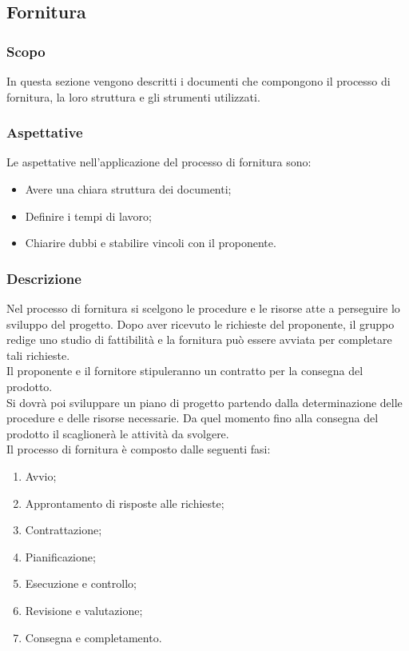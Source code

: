 \subsection{Fornitura}
\subsubsection{Scopo}
In questa sezione vengono descritti i documenti che compongono il processo di fornitura, la loro struttura e gli strumenti utilizzati.

\subsubsection{Aspettative}
Le aspettative nell'applicazione del processo di fornitura sono:
\begin{itemize}
	\item Avere una chiara struttura dei documenti;
	\item Definire i tempi di lavoro;
	\item Chiarire dubbi e stabilire vincoli con il proponente.
\end{itemize}

\subsubsection{Descrizione}
Nel processo di fornitura si scelgono le procedure e le risorse atte a perseguire lo sviluppo del progetto. Dopo aver ricevuto le richieste del proponente, il gruppo redige uno studio di fattibilità e la fornitura può essere avviata per completare tali richieste.\\
Il proponente e il fornitore stipuleranno un contratto per la consegna del prodotto.\\
Si dovrà poi sviluppare un piano di progetto partendo dalla determinazione delle procedure e delle risorse necessarie.
Da quel momento fino alla consegna del prodotto il \PdP{} scaglionerà le attività da svolgere. \\
 Il processo di fornitura è composto dalle seguenti fasi:
 \begin{enumerate}
 \item Avvio; 
\item Approntamento di risposte alle richieste;
\item Contrattazione;
\item Pianificazione;
\item Esecuzione e controllo;
\item Revisione e valutazione;
\item Consegna e completamento.
 \end{enumerate}
